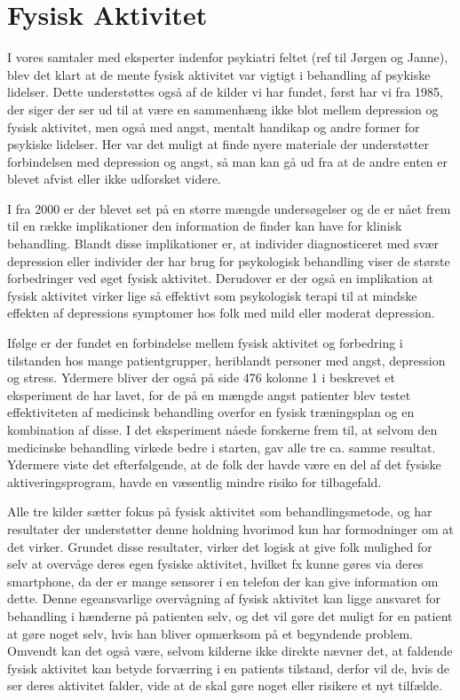 \section{Fysisk Aktivitet}
I vores samtaler med eksperter indenfor psykiatri feltet (ref til Jørgen og Janne), blev det klart at de mente fysisk aktivitet var vigtigt i behandling af psykiske lidelser.
Dette understøttes også af de kilder vi har fundet, først har vi \citet{misc:healthReports} fra 1985, der siger der ser ud til at være en sammenhæng ikke blot mellem depression og fysisk aktivitet, men også med angst, mentalt handikap og andre former for psykiske lidelser.
Her var det muligt at finde nyere materiale der understøtter forbindelsen med depression og angst, så man kan gå ud fra at de andre enten er blevet afvist eller ikke udforsket videre.

I \citet{art:physMental} fra 2000 er der blevet set på en større mængde undersøgelser og de er nået frem til en række implikationer den information de finder kan have for klinisk behandling.
Blandt disse implikationer er, at individer diagnosticeret med svær depression eller individer der har brug for psykologisk behandling viser de største forbedringer ved øget fysisk aktivitet.
Derudover er der også en implikation at fysisk aktivitet virker lige så effektivt som psykologisk terapi til at mindske effekten af depressions symptomer hos folk med mild eller moderat depression.

Ifølge \citet{book:sportPsyc} er der fundet en forbindelse mellem fysisk aktivitet og forbedring i tilstanden hos mange patientgrupper, heriblandt personer med angst, depression og stress.
Ydermere bliver der også på side 476 kolonne 1 i \citet{book:sportPsyc} beskrevet et eksperiment de har lavet, for de på en mængde angst patienter blev testet effektiviteten af medicinsk behandling overfor en fysisk træningsplan og en kombination af disse.
I det eksperiment nåede forskerne frem til, at selvom den medicinske behandling virkede bedre i starten, gav alle tre ca. samme resultat.
Ydermere viste det efterfølgende, at de folk der havde være en del af det fysiske aktiveringsprogram, havde en væsentlig mindre risiko for tilbagefald.

Alle tre kilder sætter fokus på fysisk aktivitet som behandlingsmetode, \citet{art:physMental} og \citet{book:sportPsyc} har resultater der understøtter denne holdning hvorimod \citet{misc:healthReports} kun har formodninger om at det virker.
Grundet disse resultater, virker det logisk at give folk mulighed for selv at overvåge deres egen fysiske aktivitet, hvilket fx kunne gøres via deres smartphone, da der er mange sensorer i en telefon der kan give information om dette.
Denne egeansvarlige overvågning af fysisk aktivitet kan ligge ansvaret for behandling i hænderne på patienten selv, og det vil gøre det muligt for en patient at gøre noget selv, hvis han bliver opmærksom på et begyndende problem.
Omvendt kan det også være, selvom kilderne ikke direkte nævner det, at faldende fysisk aktivitet kan betyde forværring i en patients tilstand, derfor vil de, hvis de ser deres aktivitet falder, vide at de skal gøre noget eller risikere et nyt tilfælde.

